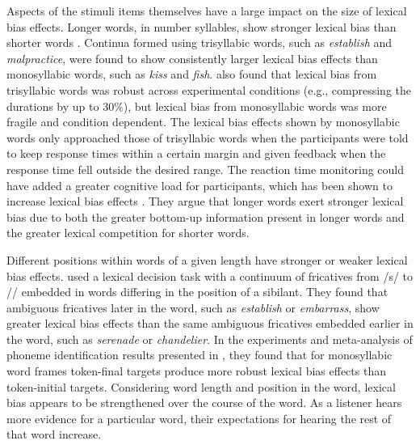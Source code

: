 Aspects of the stimuli items themselves have a large impact on the size of lexical bias effects.
Longer words, in number syllables, show stronger lexical bias than shorter words \citep{Pitt2006}.  
Continua formed using trisyllabic words, such as \emph{establish} and \emph{malpractice}, were found to show consistently larger lexical bias effects than monosyllabic words, such as \emph{kiss} and \emph{fish}.  
\citet{Pitt2006} also found that lexical bias from trisyllabic words was robust across experimental conditions (e.g., compressing the durations by up to 30\%), but lexical bias from monosyllabic words was more fragile and condition dependent.
The lexical bias effects shown by monosyllabic words only approached those of trisyllabic words when the participants were told to keep response times within a certain margin and given feedback when the response time fell outside the desired range.
The reaction time monitoring could have added a greater cognitive load for participants, which has been shown to increase lexical bias effects \citep{Mattys2011}.
They argue that longer words exert stronger lexical bias due to both the greater bottom-up information present in longer words and the greater lexical competition for shorter words.

Different positions within words of a given length have stronger or weaker lexical bias effects.
\citet{Pitt2012} used a lexical decision task with a continuum of fricatives from /s/ to /\textesh/ embedded in words differing in the position of a sibilant.  
They found that ambiguous fricatives later in the word, such as \emph{establish} or \emph{embarrass}, show greater lexical bias effects than the same ambiguous fricatives embedded earlier in the word, such as \emph{serenade} or \emph{chandelier}.
In the experiments and meta-analysis of phoneme identification results presented in \citet{Pitt1993}, they found that for monosyllabic word frames token-final targets produce more robust lexical bias effects than token-initial targets.
Considering word length and position in the word, lexical bias appears to be strengthened over the course of the word.
As a listener hears more evidence for a particular word, their expectations for hearing the rest of that word increase.


